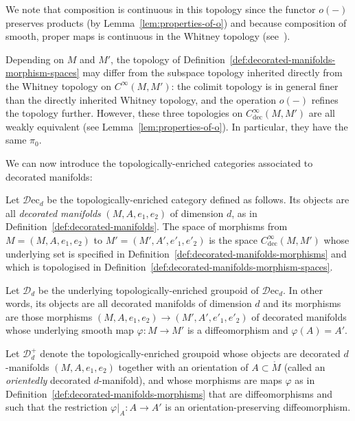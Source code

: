 \documentclass[AHL,Unicode,published]{cedram}
\newcommand{\Int}{\mathring}
\newcommand{\rdec}{\mathrm{dec}}
\newcommand{\rec}{\mathrm{ec}}
\newcommand{\cD}{\mathcal{D}}
\newcommand{\cdec}{\ensuremath{C^\infty_{\rdec}}}
\begin{document}
We note that composition is continuous in this topology since the functor $o(-)$ preserves products (by Lemma~\ref{lem:properties-of-o}) and because composition of smooth, proper maps is continuous in the Whitney topology (see~\cite[\S~2, Prop.~1]{Mather1969}).

\begin{rema}
Depending on $M$ and $M'$, the topology of Definition~\ref{def:decorated-manifolds-morphism-spaces} may differ from the subspace topology inherited directly from the Whitney topology on $C^\infty(M,M')$: the colimit topology is in general finer than the directly inherited Whitney topology, and the operation $o(-)$ refines the topology further. However, these three topologies on $\cdec(M,M')$ are all weakly equivalent (see Lemma~\ref{lem:properties-of-o}). In particular, they have the same $\pi_{0}$.
\end{rema}

We can now introduce the topologically-enriched categories associated to decorated manifolds:

\begin{defi}\label{def:Decd}
\label{def:Dd}
Let $\cD\rec_d$ be the topologica\-lly-enriched category defined as follows. Its objects are all \emph{decorated manifolds} $(M,A,e_{1},e_{2})$ of dimension $d$, as in Definition~\ref{def:decorated-manifolds}. The space of morphisms from $M = (M,A,e_{1},e_{2})$ to $M' = (M',A',e'_{1},e'_{2})$ is the space $C^\infty_{\rdec}(M,M')$ whose underlying set is specified in Definition~\ref{def:decorated-manifolds-morphisms} and which is topologised in Definition~\ref{def:decorated-manifolds-morphism-spaces}.

Let $\cD_{d}$ be the underlying topologically-enriched groupoid of $\cD\rec_d$. In other words, its objects are all decorated manifolds of dimension $d$ and its morphisms are those morphisms $(M,A,e_{1},e_{2}) \to (M',A',e'_{1},e'_{2})$ of decorated manifolds whose underlying smooth map $\varphi \colon M \to M'$ is a diffeomorphism and $\varphi(A) = A'$.

Let $\cD_{d}^{+}$ denote the topologically-enriched groupoid whose objects are decorated $d$-manifolds $(M,A,e_{1},e_{2})$ together with an orientation of $A \subset \Int{M}$ (called an \emph{orientedly} decorated $d$-manifold), and whose morphisms are maps $\varphi$ as in Definition~\ref{def:decorated-manifolds-morphisms} that are diffeomorphisms and such that the restriction $\varphi|_A \colon A \to A'$ is an orientation-preserving diffeomorphism.
\end{defi}
\end{document}
